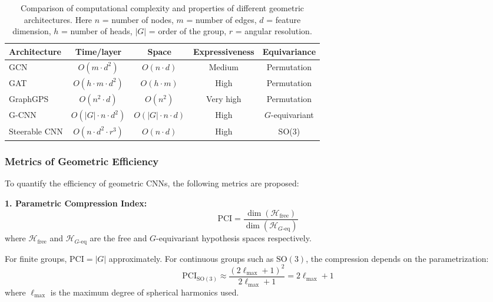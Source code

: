 \begin{table}[h]
\centering
\begin{tabular}{l|c|c|c|c}
\toprule
\textbf{Architecture} & \textbf{Time/layer} & \textbf{Space} & \textbf{Expressiveness} & \textbf{Equivariance} \\
\midrule
GCN & $O(m \cdot d^2)$ & $O(n \cdot d)$ & Medium & Permutation \\
GAT & $O(h \cdot m \cdot d^2)$ & $O(h \cdot m)$ & High & Permutation \\
GraphGPS & $O(n^2 \cdot d)$ & $O(n^2)$ & Very high & Permutation \\
G-CNN & $O(|G| \cdot n \cdot d^2)$ & $O(|G| \cdot n \cdot d)$ & High & $G$-equivariant \\
Steerable CNN & $O(n \cdot d^2 \cdot r^3)$ & $O(n \cdot d)$ & High & SO(3) \\
\bottomrule
\end{tabular}
\caption[Computational complexity of geometric architectures]{Comparison of computational complexity and properties of different geometric architectures. Here $n$ = number of nodes, $m$ = number of edges, $d$ = feature dimension, $h$ = number of heads, $|G|$ = order of the group, $r$ = angular resolution.}
\label{tab:complejidad_arquitecturas_geometricas}
\end{table}

\subsubsection{Metrics of Geometric Efficiency}\label{subsubsec:metricas_eficiencia_geometrica}

To quantify the efficiency of geometric CNNs, the following metrics are proposed:

\textbf{1. Parametric Compression Index:}
\begin{equation}
\text{PCI} = \frac{\dim(\mathcal{H}_{\text{free}})}{\dim(\mathcal{H}_{G\text{-eq}})}
\end{equation}
where $\mathcal{H}_{\text{free}}$ and $\mathcal{H}_{G\text{-eq}}$ are the free and $G$-equivariant hypothesis spaces respectively.

For finite groups, $\text{PCI} = |G|$ approximately. For continuous groups such as $\text{SO}(3)$, the compression depends on the parametrization:
\begin{equation}
\text{PCI}_{\text{SO}(3)} \approx \frac{(2\ell_{\max} + 1)^2}{2\ell_{\max} + 1} = 2\ell_{\max} + 1
\end{equation}
where $\ell_{\max}$ is the maximum degree of spherical harmonics used.

